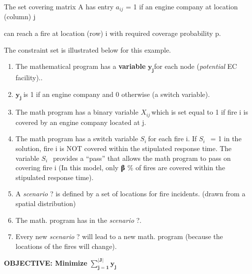 \documentclass{article} %
\begin{document}
\noindent The set covering matrix A has entry $a_{ij}$ = 1 if an engine company at location (column) j

\noindent can reach a fire at location (row) i with required coverage probability p.

The constraint set is illustrated below for this example.

\textbf{}

\begin{enumerate}
\item \textbf{\underbar{ }}The mathematical program has a \textbf{variable }${\boldsymbol{y}}_{\boldsymbol{j}}$for each node (\textit{potential} EC facility)..  

\item  ${\boldsymbol{y}}_{\boldsymbol{j}}\boldsymbol{\ }$is 1 if an engine company and 0 otherwise (a switch variable).  

\item  The math program has a binary variable $X_{ij\ }$which is set equal to 1 if fire i is covered by an engine company located at j.

\item  The math program has a switch variable $S_i\ $for each fire i.  If $S_i\ \ $ = 1 in the solution, fire i is NOT covered within the stipulated response time.  The variable $S_i\ \ $ provides a ``pass'' that allows the math program to pass on covering fire i (In this model, only \textbf{$\boldsymbol{\betaup}$ }\% of fires  are covered within the stipulated response time).

\item  A \textit{scenario }? is defined by a set of locations for fire incidents. (drawn from a spatial distribution)

\item  The math. program has  in the \textit{scenario }?.   

\item  Every new \textit{scenario} ? will lead to a new math. program (because the locations of the fires will change).  
\end{enumerate}

\noindent \textbf{OBJECTIVE:  Minimize }$\sum^{\boldsymbol{|}\boldsymbol{J}\boldsymbol{|}}_{\boldsymbol{j}\boldsymbol{=}\boldsymbol{1}}{{\boldsymbol{y}}_{\boldsymbol{j}}}$\textbf{}

\noindent \textbf{\eject }
\end{document}
